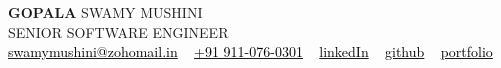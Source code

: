 \documentclass[10pt]{article}
\begin{document}
\begin{flushleft}
    {\Huge  \textbf{GOPALA} SWAMY MUSHINI}\\[2.8ex]  %
    { SENIOR SOFTWARE ENGINEER}\\[2ex]  %

    \textcolor{db5c31}{\faEnvelope} \href{mailto:swamymushini@zohomail.in}{\textcolor{black}{\large swamymushini@zohomail.in}} 
    \hspace{1mm} \textbullet\ \hspace{1mm}
    \textcolor{db5c31}{\faPhone} \href{tel:+91-9110760301}{\textcolor{black}{\large +91 911-076-0301}} 
    \hspace{1mm} \textbullet\ \hspace{1mm}
    \textcolor{db5c31}{\faLinkedin} \href{https://www.linkedin.com/in/gopal-swamy-sde3/}{\textcolor{black}{\large linkedIn}} 
    \hspace{1mm} \textbullet\ \hspace{1mm}
    \textcolor{db5c31}{\faGithub} \href{https://github.com/swamymushini}{\textcolor{black}{\large github}} 
    \hspace{1mm} \textbullet\ \hspace{1mm}
    \textcolor{db5c31}{\faGlobe} \href{https://gopalaswamy.me}{\textcolor{black}{\large portfolio}} 

\end{flushleft}
\vspace{-2.4ex}
\end{document}
